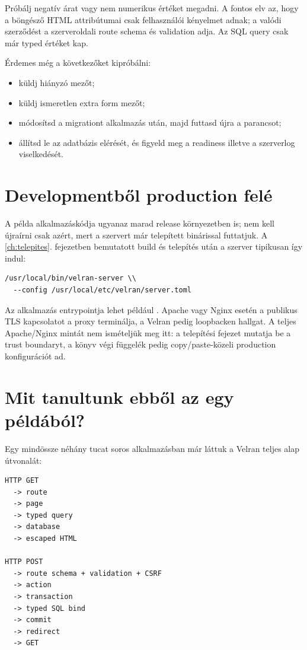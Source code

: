 Próbálj negatív árat vagy nem numerikus értéket megadni. A fontos elv az, hogy a böngésző HTML attribútumai csak felhasználói kényelmet adnak; a valódi szerződést a szerveroldali route schema és validation adja. Az SQL query csak már typed értéket kap.

Érdemes még a következőket kipróbálni:

\begin{itemize}
  \item küldj hiányzó  mezőt;
  \item küldj ismeretlen extra form mezőt;
  \item módosítsd a migrationt alkalmazás után, majd futtasd újra a  parancsot;
  \item állítsd le az adatbázis elérését, és figyeld meg a readiness illetve a szerverlog viselkedését.
\end{itemize}

\section{Developmentből production felé}

A példa alkalmazáskódja ugyanaz marad release környezetben is; nem kell újraírni csak azért, mert a szervert már telepített binárissal futtatjuk. A \ref{ch:telepites}. fejezetben bemutatott build és telepítés után a szerver tipikusan így indul:

\begin{lstlisting}
/usr/local/bin/velran-server \\
  --config /usr/local/etc/velran/server.toml
\end{lstlisting}

Az alkalmazás entrypointja lehet például . Apache vagy Nginx esetén a publikus TLS kapcsolatot a proxy terminálja, a Velran pedig loopbacken hallgat. A teljes Apache/Nginx mintát nem ismételjük meg itt: a telepítési fejezet mutatja be a trust boundaryt, a könyv végi függelék pedig copy/paste-közeli production konfigurációt ad.

\section{Mit tanultunk ebből az egy példából?}

Egy mindössze néhány tucat soros alkalmazásban már láttuk a Velran teljes alap útvonalát:

\begin{lstlisting}
HTTP GET
  -> route
  -> page
  -> typed query
  -> database
  -> escaped HTML

HTTP POST
  -> route schema + validation + CSRF
  -> action
  -> transaction
  -> typed SQL bind
  -> commit
  -> redirect
  -> GET
\end{lstlisting}


